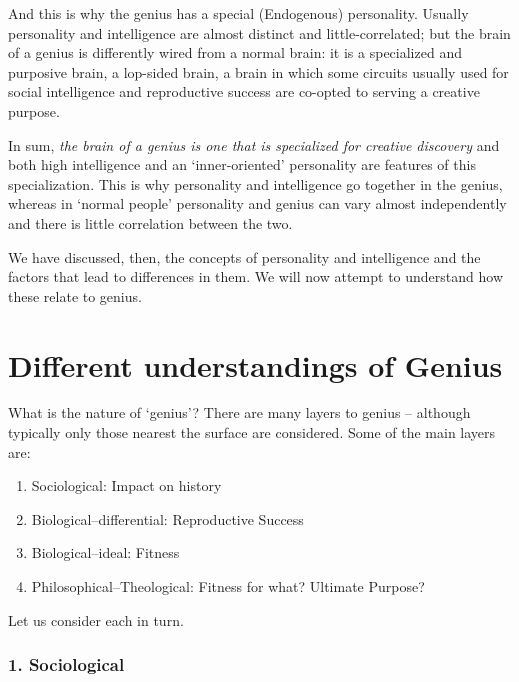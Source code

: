 \documentclass[
]{book}
\providecommand{\tightlist}{%
  \setlength{\itemsep}{0pt}\setlength{\parskip}{0pt}}
\begin{document}
And this is why the genius has a special (Endogenous) personality. Usually personality and intelligence are almost distinct and little-correlated; but the brain of a genius is differently wired from a normal brain: it is a specialized and purposive brain, a lop-sided brain, a brain in which some circuits usually used for social intelligence and reproductive success are co-opted to serving a creative purpose.

In sum, \emph{the brain of a genius is one that is specialized for creative discovery} and both high intelligence and an `inner-oriented' personality are features of this specialization. This is why personality and intelligence go together in the genius, whereas in `normal people' personality and genius can vary almost independently and there is little correlation between the two.

We have discussed, then, the concepts of personality and intelligence and the factors that lead to differences in them. We will now attempt to understand how these relate to genius.

\hypertarget{different-understandings-of-genius}{%
\chapter{Different understandings of Genius}\label{different-understandings-of-genius}}

What is the nature of `genius'? There are many layers to genius -- although typically only those nearest the surface are considered. Some of the main layers are:

\begin{enumerate}
\def\labelenumi{\arabic{enumi}.}
\tightlist
\item
  Sociological: Impact on history
\item
  Biological--differential: Reproductive Success
\item
  Biological--ideal: Fitness
\item
  Philosophical--Theological: Fitness for what? Ultimate Purpose?
\end{enumerate}

Let us consider each in turn.

\hypertarget{sociological}{%
\subsection*{1. Sociological}\label{sociological}}
\end{document}
